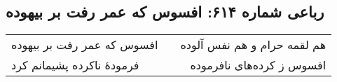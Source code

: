 \begin{center}
\section*{رباعی شماره ۶۱۴: افسوس که عمر رفت بر بیهوده}
\label{sec:sh614}
\begin{longtable}{l p{0.5cm} r}
افسوس که عمر رفت بر بیهوده
&&
هم لقمه حرام و هم نفس آلوده
\\
فرمودهٔ ناکرده پشیمانم کرد
&&
افسوس ز کرده‌های نافرموده
\\
\end{longtable}
\end{center}
